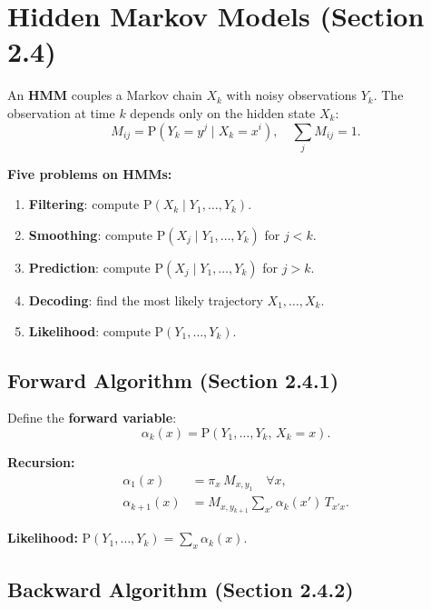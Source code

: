 \documentclass[12pt, a4paper]{article}
\begin{document}
\section{Hidden Markov Models (Section 2.4)}

An \textbf{HMM} couples a Markov chain $X_k$ with noisy observations
$Y_k$. The observation at time $k$ depends only on the hidden state
$X_k$:
\begin{equation}
  M_{ij} = \mathrm{P}(Y_k=y^j\mid X_k=x^i), \quad \sum_j M_{ij}=1.
\end{equation}

\textbf{Five problems on HMMs:}
\begin{enumerate}
  \item \textbf{Filtering}: compute $\mathrm{P}(X_k\mid Y_1,\ldots,Y_k)$.
  \item \textbf{Smoothing}: compute $\mathrm{P}(X_j\mid Y_1,\ldots,Y_k)$ for $j<k$.
  \item \textbf{Prediction}: compute $\mathrm{P}(X_j\mid Y_1,\ldots,Y_k)$ for $j>k$.
  \item \textbf{Decoding}: find the most likely trajectory $X_1,\ldots,X_k$.
  \item \textbf{Likelihood}: compute $\mathrm{P}(Y_1,\ldots,Y_k)$.
\end{enumerate}

\subsection{Forward Algorithm (Section 2.4.1)}

Define the \textbf{forward variable}:
\begin{equation}
  \alpha_k(x) = \mathrm{P}(Y_1,\ldots,Y_k,\, X_k=x).
\end{equation}

\textbf{Recursion:}
\begin{align}
  \alpha_1(x) &= \pi_x\, M_{x,y_1} \quad \forall x, \\
  \alpha_{k+1}(x) &= M_{x,y_{k+1}} \sum_{x'} \alpha_k(x')\, T_{x'x}.
\end{align}

\textbf{Likelihood:} $\mathrm{P}(Y_1,\ldots,Y_k)=\sum_x\alpha_k(x)$.

\subsection{Backward Algorithm (Section 2.4.2)}
\end{document}
